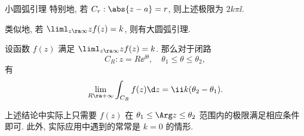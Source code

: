 \begin{frame}{小圆弧引理\noexer}
	\onslide<+->
	特别地, 若 $C_r:\abs{z-a}=r$, 则上述极限为 $2k\pi \ii$.

	\onslide<+->
	类似地, 若 $\liml_{z\ra \infty} zf(z)=k$, 则有大圆弧引理.
	\begin{theorem*}[][大圆弧引理]
		设函数 $f(z)$ 满足 $\liml_{z\ra\infty}zf(z)=k$.
		那么对于闭路
		\[
			C_R: z=R\ee^{\ii \theta},\quad \theta_1\le\theta\le\theta_2,
		\]
		有
		\[
			\lim_{R\ra+\infty}\int_{C_R}f(z)\d z=\ii k(\theta_2-\theta_1).
		\]
	\end{theorem*}
	\onslide<+->
	上述结论中实际上只需要 $f(z)$ 在 $\theta_1\le \Arg z\le \theta_2$ 范围内的极限满足相应条件即可.
	\onslide<+->
	此外, 实际应用中遇到的常常是 $k=0$ 的情形.
\end{frame}
